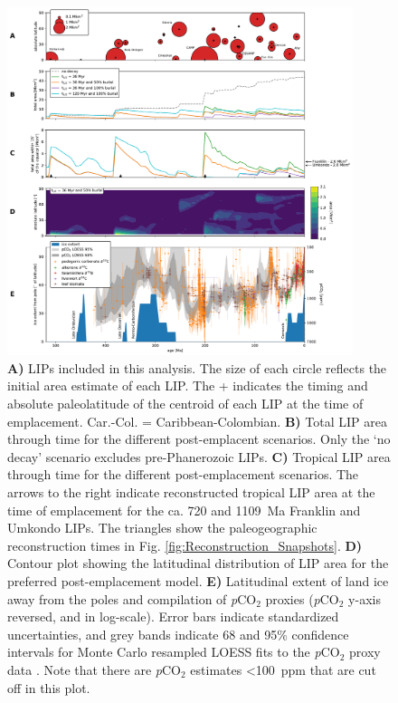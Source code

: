 \documentclass[11pt,letterpaper]{article}
\begin{document}
\begin{figure}[h!]
\begin{center}
	\includegraphics[width=0.9\textwidth]{Manuscript/Figures/LIP_Areas.pdf}
	\caption{\textbf{A)} LIPs included in this analysis. The size of each circle reflects the initial area estimate of each LIP. The + indicates the timing and absolute paleolatitude of the centroid of each LIP at the time of emplacement. Car.-Col. = Caribbean-Colombian. \textbf{B)} Total LIP area through time for the different post-emplacent scenarios. Only the `no decay' scenario excludes pre-Phanerozoic LIPs. \textbf{C)} Tropical LIP area through time for the different post-emplacement scenarios. The arrows to the right indicate reconstructed tropical LIP area at the time of emplacement for the ca. 720 and 1109~Ma Franklin and Umkondo LIPs. The triangles show the paleogeographic reconstruction times in Fig. \ref{fig:Reconstruction_Snapshots}. \textbf{D)} Contour plot showing the latitudinal distribution of LIP area for the preferred post-emplacement model. \textbf{E)} Latitudinal extent of land ice away from the poles \citep{Macdonald2019a} and compilation of \textit{p}CO$_{2}$ proxies \citep{Foster2017a} (\textit{p}CO$_{2}$ y-axis reversed, and in log-scale). Error bars indicate standardized uncertainties, and grey bands indicate 68 and 95\% confidence intervals for Monte Carlo resampled LOESS fits to the \textit{p}CO$_{2}$ proxy data \citep{Foster2017a}. Note that there are \textit{p}CO$_{2}$ estimates \textless100~ppm that are cut off in this plot.}
	\label{fig:LIP_Areas}
\end{center}
\end{figure}
\end{document}
